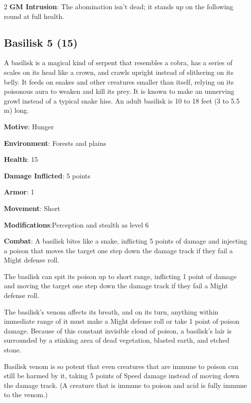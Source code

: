 \begin{multicols}{2}
\textbf{GM Intrusion}: The abomination isn’t dead; it stands up on the following round at full health.

\subsection{Basilisk 	5 (15)}

A basilisk is a magical kind of serpent that resembles a cobra, has a series of scales on its head like a crown, and crawls upright instead of slithering on its belly. It feeds on snakes and other creatures smaller than itself, relying on its poisonous aura to weaken and kill its prey. It is known to make an unnerving growl instead of a typical snake hiss. An adult basilisk is 10 to 18 feet (3 to 5.5 m) long. 

\textbf{Motive}: Hunger 

\textbf{Environment}: Forests and plains 

\textbf{Health}: 15 

\textbf{Damage Inflicted}: 5 points 

\textbf{Armor}: 1 

\textbf{Movement}: Short 

\textbf{Modifications}:Perception and stealth as level 6 

\textbf{Combat}: A basilisk bites like a snake, inflicting 5 points of damage and injecting a poison that moves the target one step down the damage track if they fail a Might defense roll. 

The basilisk can spit its poison up to short range, inflicting 1 point of damage and moving the target one step down the damage track if they fail a Might defense roll. 

The basilisk’s venom affects its breath, and on its turn, anything within immediate range of it must make a Might defense roll or take 1 point of poison damage. Because of this constant invisible cloud of poison, a basilisk’s lair is surrounded by a stinking area of dead vegetation, blasted earth, and etched stone. 

Basilisk venom is so potent that even creatures that are immune to poison can still be harmed by it, taking 5 points of Speed damage instead of moving down the damage track. (A creature that is immune to poison and acid is fully immune to the venom.) 


\end{multicols}
